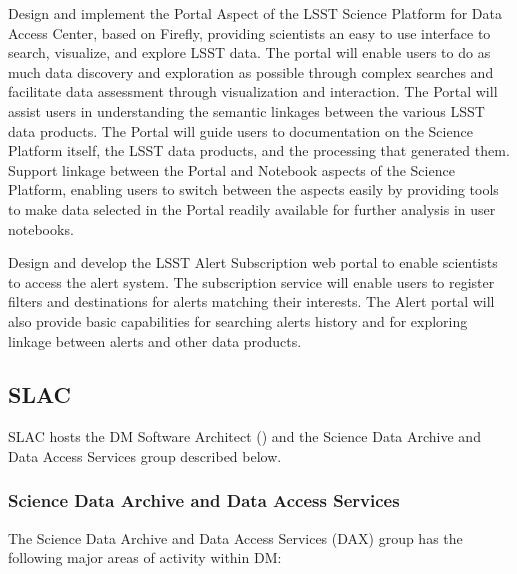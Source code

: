 Design and implement the Portal Aspect of the LSST Science Platform for Data Access Center, based on Firefly, providing scientists an easy to use interface to search, visualize, and explore LSST data. The portal will enable users to do as much data discovery and exploration as possible through complex searches and facilitate data assessment through visualization and interaction.  The Portal will assist users in understanding the semantic linkages between the various LSST data products. The Portal will guide users to documentation on the Science Platform itself, the LSST data products, and the processing that generated them.  Support linkage between the Portal and Notebook aspects of the Science Platform, enabling users to switch between the aspects easily by providing tools to make data selected in the Portal readily available for further analysis in user notebooks.

Design and develop the LSST Alert Subscription web portal to enable scientists to access the alert system. The subscription service will enable users to register filters and destinations for alerts matching their interests. The Alert portal will also provide basic capabilities for searching alerts history and for exploring linkage between alerts and other data products.




\subsection {SLAC\label{sect:slac}}
SLAC hosts the DM Software Architect () and the Science Data Archive and Data Access
Services group described below.

\subsubsection{Science Data Archive and Data Access Services \label{sect:dax}}

The Science Data Archive and Data Access Services (DAX) group has the following major areas of activity
within DM:

